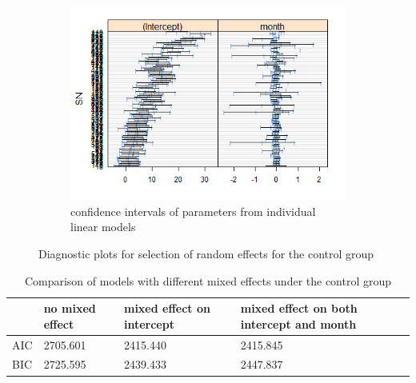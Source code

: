 \begin{figure}[H]
\begin{subfigure}{.33\textwidth}
  \includegraphics[width=1\linewidth]{../../plots/interval_control.png}
  \caption{confidence intervals of parameters from individual linear models}
\end{subfigure}
\caption{Diagnostic plots for selection of random effects for the control group}
\label{fig:diagnostic.control}
\end{figure}

\begin{table}[H]
\centering
\begin{tabular}{|l|l|l|l|}
\hline
& no mixed effect & mixed effect on intercept & mixed effect on both intercept and month \\
\hline
AIC & 2705.601 & 2415.440 & 2415.845 \\
\hline
BIC & 2725.595 & 2439.433 & 2447.837 \\
\hline
\end{tabular}
\caption{Comparison of models with different mixed effects under the control group}
\label{tab:model.comp.control.me}
\end{table}

\begin{table}[H]
\centering
{}
\caption{P values of Likelihood Ratio tests between models with different mixed effects under the control group}
\label{tab:model.comp.control.me.lrt}
\end{table}

